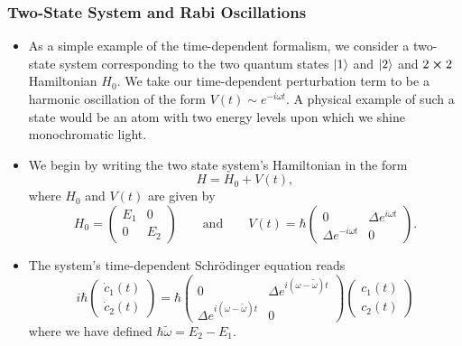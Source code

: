 \documentclass[11pt, a4paper]{article}
\newcommand{\Schro}{Schr\"{o}dinger\xspace}
\begin{document}
\subsubsection{Two-State System and Rabi Oscillations}
\begin{itemize}
    \item As a simple example of the time-dependent formalism, we consider a two-state system corresponding to the two quantum states $ \ket{1} $ and $ \ket{2} $ and  $ 2\cross 2 $ Hamiltonian $ H_{0} $. We take our time-dependent perturbation term to be a harmonic oscillation of the form $ V(t) \sim e^{-i\omega t} $. A physical example of such a state would be an atom with two energy levels upon which we shine monochromatic light.

    \item We begin by writing the two state system's Hamiltonian in the form
    \begin{equation*}
        H = H_{0} + V(t),
    \end{equation*}
    where $ H_{0} $ and $ V(t) $ are given by
    \begin{equation*}
        H_{0} = 
        \begin{pmatrix}
            E_{1} & 0\\
            0 & E_{2}
        \end{pmatrix}
        \qquad \text{and} \qquad 
        V(t) = \hbar
        \begin{pmatrix}
            0 & \Delta e^{i\omega t}\\
            \Delta e^{-i\omega t} & 0
        \end{pmatrix}.
    \end{equation*}

    \item The system's time-dependent \Schro equation reads
    \begin{equation*}
        i \hbar 
        \begin{pmatrix}
            \dot{c}_{1}(t)\\
            \dot{c}_{2}(t)
        \end{pmatrix}
        = \hbar
        \begin{pmatrix}
            0 & \Delta e^{i(\omega - \tilde{\omega})t}\\
            \Delta e^{i(\omega - \tilde{\omega})t} & 0
        \end{pmatrix}
        \begin{pmatrix}
            c_{1}(t)\\
            c_{2}(t)
        \end{pmatrix}
    \end{equation*}
    where we have defined $ \hbar \tilde{\omega} = E_{2} - E_{1} $.
    

\end{itemize}
\end{document}
